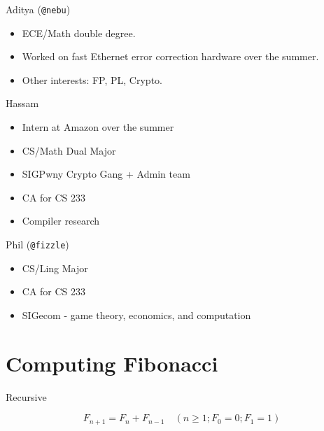 \documentclass[aspectratio=169, handout]{beamer}
\begin{document}

\begin{frame}{Aditya (\texttt{@nebu})}
    \begin{itemize}
        \item ECE/Math double degree.
        \item Worked on fast Ethernet error correction hardware over the summer.
        \item Other interests: FP, PL, Crypto.
    \end{itemize} 
\end{frame}

\begin{frame}{Hassam}
    \begin{itemize}
        \item Intern at Amazon over the summer
        \item CS/Math Dual Major
        \item SIGPwny Crypto Gang + Admin team
        \item CA for CS 233
        \item Compiler research
    \end{itemize}
\end{frame}

\begin{frame}{Phil (\texttt{@fizzle})}
    \begin{itemize}
        \item CS/Ling Major
        \item CA for CS 233
        \item SIGecom - game theory, economics, and computation
    \end{itemize}
\end{frame}

\section{Computing Fibonacci}
\frame{\sectionpage}

\begin{frame}{Recursive}
    
    $$
        F_{n+1} = F_n + F_{n - 1}\quad (n \geq 1; F_0 = 0; F_1 = 1)
    $$
    
\end{frame}
\end{document}

